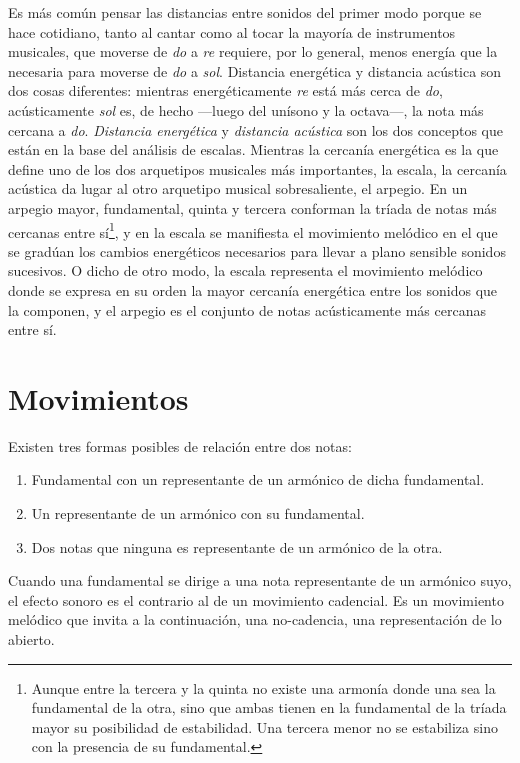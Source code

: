 \documentclass[a4paper,12pt]{article}
\begin{document}
\begin{multicols}{2}
  Es más común pensar las distancias entre sonidos del primer modo porque se hace cotidiano, tanto al cantar como al tocar la mayoría de instrumentos musicales, que moverse de \emph{do} a \emph{re} requiere, por lo general, menos energía que la necesaria para moverse de \emph{do} a \emph{sol}. Distancia energética y distancia acústica son dos cosas diferentes: mientras energéticamente \emph{re} está más cerca de \emph{do}, acústicamente \emph{sol} es, de hecho ---luego del unísono y la octava---, la nota más cercana a \emph{do}. \emph{Distancia energética} y \emph{distancia acústica} son los dos conceptos que están en la base del análisis de escalas. Mientras la cercanía energética es la que define uno de los dos arquetipos musicales más importantes, la escala, la cercanía acústica da lugar al otro arquetipo musical sobresaliente, el arpegio. En un arpegio mayor, fundamental, quinta y tercera conforman la tríada de notas más cercanas entre sí\footnote{Aunque entre la tercera y la quinta no existe una armonía donde una sea la fundamental de la otra, sino que ambas tienen en la fundamental de la tríada mayor su posibilidad de estabilidad. Una tercera menor no se estabiliza sino con la presencia de su fundamental.}, y en la escala se manifiesta el movimiento melódico en el que se gradúan los cambios energéticos necesarios para llevar a plano sensible sonidos sucesivos. O dicho de otro modo, la escala representa el movimiento melódico donde se expresa en su orden la mayor cercanía energética entre los sonidos que la componen, y el arpegio es el conjunto de notas acústicamente más cercanas entre sí.

\section{Movimientos}\label{sec:movimientos}

  Existen tres formas posibles de relación entre dos notas:
  \begin{enumerate}
    \item Fundamental con un representante de un armónico de dicha fundamental.
    \item Un representante de un armónico con su fundamental.
    \item Dos notas que ninguna es representante de un armónico de la otra.
  \end{enumerate}

  Cuando una fundamental se dirige a una nota representante de un armónico suyo, el efecto sonoro es el contrario al de un movimiento cadencial. Es un movimiento melódico que invita a la continuación, una no-cadencia, una representación de lo abierto.


\end{multicols}
\end{document}
